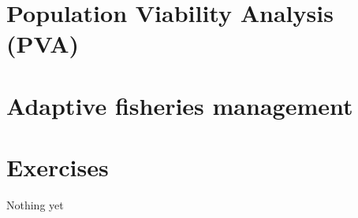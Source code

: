 \documentclass[11pt,fleqn]{book} %
\begin{document}
\section{Population Viability Analysis (PVA)} \label{PVA}

\section{Adaptive fisheries management}

\section*{Exercises}

\begin{exercise}
Nothing yet
\end{exercise}





\end{document}
